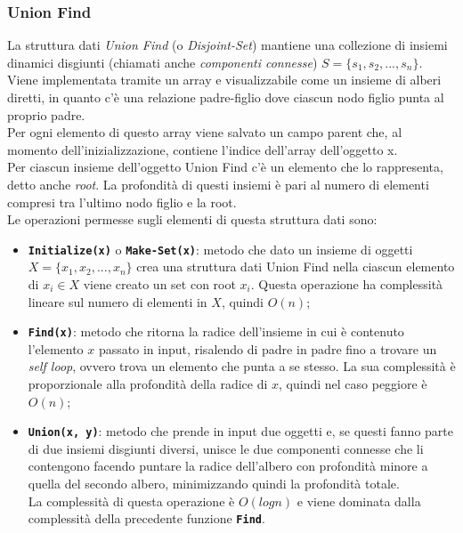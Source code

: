 	\subsubsection{Union Find}
		La struttura dati \textit{Union Find} (o \textit{Disjoint-Set}) mantiene una collezione di insiemi dinamici disgiunti (chiamati anche \textit{componenti connesse}) $S = \{s_1, s_2, ... , s_n\}$.
		Viene implementata tramite un array e visualizzabile come un insieme di alberi diretti, in quanto c'è una relazione padre-figlio dove ciascun nodo figlio punta al proprio padre.\\
		Per ogni elemento di questo array viene salvato un campo parent che, al momento dell'inizializzazione, contiene l'indice dell'array dell'oggetto x.\\
		Per ciascun insieme dell'oggetto Union Find c'è un elemento che lo rappresenta, detto anche \textit{root}. 
		La profondità di questi insiemi è pari al numero di elementi compresi tra l'ultimo nodo figlio e la root.\\
		Le operazioni permesse sugli elementi di questa struttura dati sono:
		\begin{itemize}
			\item \texttt{\textbf{Initialize(x)}} o \texttt{\textbf{Make-Set(x)}}: metodo che dato un insieme di oggetti $X = \{x_1, x_2, ... , x_n\}$ crea una struttura dati Union Find nella ciascun elemento di $x_i \in X$ viene creato un set con root $x_i$.
			Questa operazione ha complessità lineare sul numero di elementi in $X$, quindi $O(n)$;
			\item \texttt{\textbf{Find(x)}}: metodo che ritorna la radice dell'insieme in cui è contenuto l'elemento $x$ passato in input, risalendo di padre in padre fino a trovare un \textit{self loop}, ovvero trova un elemento che punta a se stesso. 
			La sua complessità è proporzionale alla profondità della radice di $x$, quindi nel caso peggiore è $O(n)$;
			\item \texttt{\textbf{Union(x, y)}}: metodo che prende in input due oggetti e, se questi fanno parte di due insiemi disgiunti diversi, unisce le due componenti connesse che li contengono facendo puntare la radice dell'albero con profondità minore a quella del secondo albero, minimizzando quindi la profondità totale. \\
			La complessità di questa operazione è $O(log n)$ e viene dominata dalla complessità della precedente funzione \texttt{\textbf{Find}}.
		\end{itemize}

